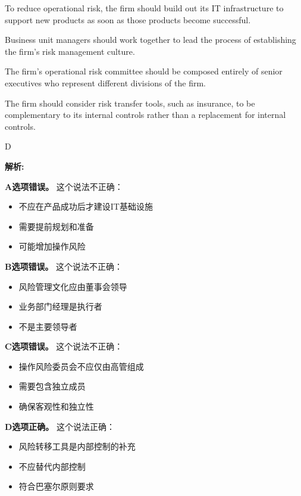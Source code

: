 \documentclass{article}
\newenvironment{explanation}
{\textbf{解析:}\par}
{\par}
\begin{document}
\begin{choices}
    \item To reduce operational risk, the firm should build out its IT infrastructure to support new products as soon as those products become successful.
    \item Business unit managers should work together to lead the process of establishing the firm's risk management culture.
    \item The firm's operational risk committee should be composed entirely of senior executives who represent different divisions of the firm.
    \item The firm should consider risk transfer tools, such as insurance, to be complementary to its internal controls rather than a replacement for internal controls.
\end{choices}

\begin{correctanswer}
    D
\end{correctanswer}

\begin{explanation}
    \textbf{A选项错误。}
    这个说法不正确：
    \begin{itemize}
        \item 不应在产品成功后才建设IT基础设施
        \item 需要提前规划和准备
        \item 可能增加操作风险
    \end{itemize}

    \textbf{B选项错误。}
    这个说法不正确：
    \begin{itemize}
        \item 风险管理文化应由董事会领导
        \item 业务部门经理是执行者
        \item 不是主要领导者
    \end{itemize}

    \textbf{C选项错误。}
    这个说法不正确：
    \begin{itemize}
        \item 操作风险委员会不应仅由高管组成
        \item 需要包含独立成员
        \item 确保客观性和独立性
    \end{itemize}

    \textbf{D选项正确。}
    这个说法正确：
    \begin{itemize}
        \item 风险转移工具是内部控制的补充
        \item 不应替代内部控制
        \item 符合巴塞尔原则要求
    \end{itemize}
\end{explanation}
\end{document}
